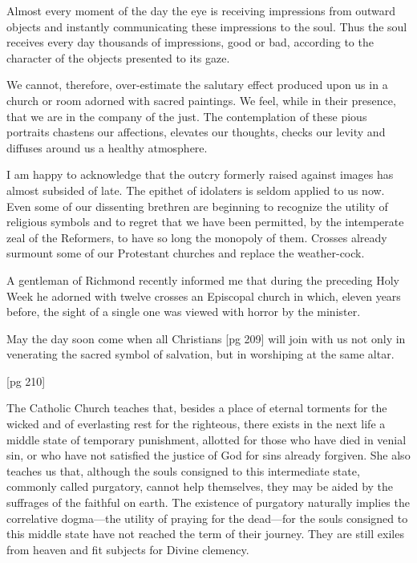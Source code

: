 Almost every moment of the day the eye is receiving
impressions from outward objects and
instantly communicating these impressions to the
soul. Thus the soul receives every day thousands
of impressions, good or bad, according to the
character of the objects presented to its gaze.

We cannot, therefore, over-estimate the salutary
effect produced upon us in a church or room
adorned with sacred paintings. We feel, while
in their presence, that we are in the company of
the just. The contemplation of these pious portraits
chastens our affections, elevates our
thoughts, checks our levity and diffuses around
us a healthy atmosphere.

I am happy to acknowledge that the outcry formerly
raised against images has almost subsided
of late. The epithet of idolaters is seldom applied
to us now. Even some of our dissenting
brethren are beginning to recognize the utility of
religious symbols and to regret that we have been
permitted, by the intemperate zeal of the Reformers,
to have so long the monopoly of them.
Crosses already surmount some of our Protestant
churches and replace the weather-cock.

A gentleman of Richmond recently informed
me that during the preceding Holy Week he
adorned with twelve crosses an Episcopal church
in which, eleven years before, the sight of a single
one was viewed with horror by the minister.

May the day soon come when all Christians
[pg 209]
will join with us not only in venerating the sacred
symbol of salvation, but in worshiping at the same
altar.

[pg 210]


The Catholic Church teaches that, besides a
place of eternal torments for the wicked and
of everlasting rest for the righteous, there
exists in the next life a middle state of temporary
punishment, allotted for those who have died
in venial sin, or who have not satisfied the justice
of God for sins already forgiven. She also
teaches us that, although the souls consigned to
this intermediate state, commonly called purgatory,
cannot help themselves, they may be aided
by the suffrages of the faithful on earth. The
existence of purgatory naturally implies the correlative
dogma—the utility of praying for the
dead—for the souls consigned to this middle state
have not reached the term of their journey. They
are still exiles from heaven and fit subjects for
Divine clemency.

